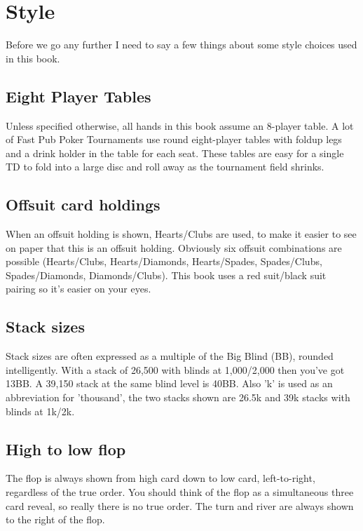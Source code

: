 \chapter{Style}


Before we go any further I need to say a few things about
some style choices used in this book.

\section*{Eight Player Tables}

Unless specified otherwise, all hands in this book assume an
8-player table. A lot of Fast Pub Poker Tournaments use
round eight-player tables with foldup legs and a drink holder
in the table for each seat. These tables are easy for a single TD
to fold into a large disc and roll away as the tournament
field shrinks.

\section*{Offsuit card holdings}

When an offsuit holding is shown, Hearts/Clubs are used, to make
it easier to see on paper that this is an offsuit holding. Obviously
six offsuit combinations are possible (Hearts/Clubs, Hearts/Diamonds,
Hearts/Spades, Spades/Clubs, Spades/Diamonds, Diamonds/Clubs).
This book uses a red suit/black suit pairing so it's easier on your eyes.


\section*{Stack sizes}

Stack sizes are often expressed as a multiple of the Big Blind (BB),
rounded intelligently. With a stack of 26,500 with blinds at 1,000/2,000
then you've got 13BB. A 39,150 stack at the same blind level is 40BB.
Also 'k' is used as an abbreviation for 'thousand', the two stacks
shown are 26.5k and 39k stacks with blinds at 1k/2k.

\section*{High to low flop}

The flop is always shown from high card down to low card, left-to-right,
regardless of the true order. You should think of the flop as a
simultaneous three card reveal, so really there is no true order. The turn
and river are always shown to the right of the flop.

